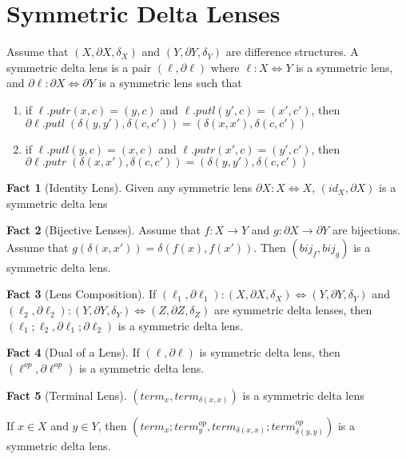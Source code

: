 \documentclass[acmsmall,review,anonymous]{acmart}\settopmatter{printfolios=true,printccs=false,printacmref=false}
\theoremstyle{definition}
\newtheorem{fact}{Fact}
\begin{document}
\section{Symmetric Delta Lenses}
Assume that $(X, \partial X, \delta_X)$ and $(Y, \partial Y, \delta_Y)$
are difference structures. A symmetric delta lens is a pair $(\ell, \partial
\ell)$ where $\ell : X \Leftrightarrow Y$ is a symmetric lens, and
$\partial \ell : \partial X \Leftrightarrow \partial Y$ is a symmetric lens
such that
\begin{enumerate}
  \item
  if $\ell.putr(x, c) = (y, c)$ and $\ell.putl(y', c) = (x', c')$,
  then $\partial \ell.putl \; (\delta(y, y'), \delta(c, c')) = (\delta(x,
  x'), \delta(c, c'))$
  \item
  if $\ell.putl(y, c) = (x, c)$ and $\ell.putr(x', c) = (y', c')$, then
  $\partial \ell.putr \; (\delta(x, x'), \delta(c, c')) = (\delta(y, y'),
  \delta(c, c'))$
\end{enumerate}
\begin{fact}[Identity Lens]
Given any symmetric lens $\partial X : X \Leftrightarrow X$, $(id_X, \partial
X)$ is a symmetric delta lens
\end{fact}
\begin{fact}[Bijective Lenses]
Assume that $f : X \longrightarrow Y$ and $g : \partial X \longrightarrow
\partial Y$ are bijections. Assume that $g(\delta(x, x')) = \delta(f(x),
f(x'))$. Then $(bij_f, bij_g)$ is a symmetric delta lens.
\end{fact}
\begin{fact}[Lens Composition]
If $(\ell_1, \partial \ell_1) : (X, \partial X, \delta_X) \Leftrightarrow (Y,
\partial Y, \delta_Y)$ and $(\ell_2, \partial \ell_2): (Y, \partial Y,
\delta_Y) \Leftrightarrow (Z, \partial Z, \delta_Z)$ are symmetric delta
lenses, then $(\ell_1;\ell_2, \partial \ell_1;\partial \ell_2)$ is a symmetric
delta lens.
\end{fact}
\begin{fact}[Dual of a Lens]
If $(\ell, \partial \ell)$ is symmetric delta lens, then $(\ell^{op}, \partial
\ell^{op})$ is a symmetric delta lens.
\end{fact}
\begin{fact}[Terminal Lens]
$(term_x, term_{\delta(x, x)})$ is a symmetric delta lens
\end{fact}
\begin{corollary}
If $x \in X$ and $y \in Y$, then $(term_x;term_y^{op},
term_{\delta(x, x)};term_{\delta(y, y)}^{op})$ is a symmetric delta lens.
\end{corollary}
\end{document}
